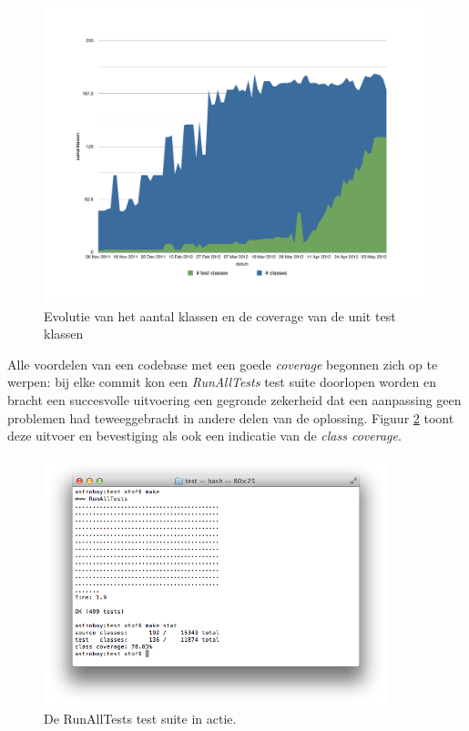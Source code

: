\documentclass[12pt,a4paper]{report}
\begin{document}
\begin{figure}[htbp]
  \centering
  \includegraphics[width=115mm]{resources/coverage.pdf}
  \caption{Evolutie van het aantal klassen en de coverage van de unit test klassen}
  \label{fig:coverage}
\end{figure}

Alle voordelen van een codebase met een goede \emph{coverage} begonnen zich op te werpen: bij elke commit kon een \emph{RunAllTests} test suite doorlopen worden en bracht een succesvolle uitvoering een gegronde zekerheid dat een aanpassing geen problemen had teweeggebracht in andere delen van de oplossing. Figuur \ref{fig:runalltests} toont deze uitvoer en bevestiging als ook een indicatie van de \emph{class coverage}.

\begin{figure}[htbp]
  \centering
  \includegraphics[width=100mm]{resources/runalltests.png}
  \caption{De RunAllTests test suite in actie.}
  \label{fig:runalltests}
\end{figure}
\end{document}
